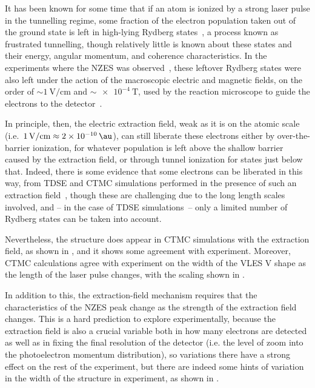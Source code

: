 It has been known for some time that if an atom is ionized by a strong laser pulse in the tunnelling regime, some fraction of the electron population taken out of the ground state is left in high-lying Rydberg states~\cite{ nubbemeyer_rydberg-creation_2008, landsman_Rydberg-creation_2015, larimian_rydberg-detection_conference_2015}, a process known as frustrated tunnelling, though relatively little is known about these states and their energy, angular momentum, and coherence characteristics. In the experiments where the NZES was observed~\cite{dura_ionization_2013, ZES_paper}, these leftover Rydberg states were also left under the action of the macroscopic electric and magnetic fields, on the order of ${\sim}\SI{1}{\volt/\centi\meter}$ and ${\sim}\SI{e-4}{\tesla}$, used by the reaction microscope to guide the electrons to the detector~\cite{moshammer_ReMi_2003}.




In principle, then, the electric extraction field, weak as it is on the atomic scale (i.e.~$\SI{1}{\volt/\centi\meter}\approx \SI{2e-10}{\au}$), can still liberate these electrons either by over-the-barrier ionization, for whatever population is left above the shallow barrier caused by the extraction field, or through tunnel ionization for states just below that. Indeed, there is some evidence that some electrons can be liberated in this way, from TDSE and CTMC simulations performed in the presence of such an extraction field~\cite{ZES_paper, Rost_latest}, though these are challenging due to the long length scales involved, and -- in the case of TDSE simulations~-- only a limited number of Rydberg states can be taken into account.


Nevertheless, the structure does appear in CTMC simulations with the extraction field, as shown in , and it shows some agreement with experiment. Moreover, CTMC calculations agree with experiment on the width of the VLES V shape as the length of the laser pulse changes, with the scaling shown in .


In addition to this, the extraction-field mechanism requires that the characteristics of the NZES peak change as the strength of the extraction field changes. This is a hard prediction to explore experimentally, because the extraction field is also a crucial variable both in how many electrons are detected as well as in fixing the final resolution of the detector (i.e. the level of zoom into the photoelectron momentum distribution), so variations there have a strong effect on the rest of the experiment, but there are indeed some hints of variation in the width of the structure in experiment, as shown in . 


